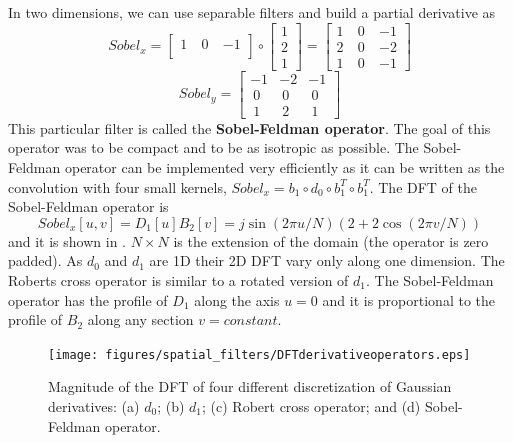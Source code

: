 In two dimensions, we can use separable filters and build a partial derivative as
\begin{equation}
	Sobel_x =  \begin{bmatrix}
		1 ~ & 0 ~ & -1 \\
	\end{bmatrix}\circ \begin{bmatrix}
		1 \\
		2 \\
		1
	\end{bmatrix}=
	\begin{bmatrix}
		1 ~ & 0 ~ & -1 \\
		2 ~ & 0 ~ & -2 \\
		1~  & 0 ~ & -1
	\end{bmatrix}
\end{equation}
\begin{equation}
	Sobel_y =  \begin{bmatrix}
		-1 & -2 & -1 \\
		~0 & ~0 & ~0 \\
		~1 & ~2 & ~1
	\end{bmatrix}
	\label{eq:sobel_kernels}
\end{equation}
This particular filter is called the {\bf Sobel-Feldman operator}.
The goal of this operator was to be compact and to be as isotropic as possible. The Sobel-Feldman operator can be implemented very efficiently as it can be written as the convolution with four small kernels, $Sobel_x=b_1 \circ d_0 \circ b_1^T \circ b_1^T$.
The DFT of the Sobel-Feldman operator is
\begin{equation}
	Sobel_x \left[u,v \right] = D_1\left[u\right] B_2 \left[v \right] = j \sin \left( 2 \pi u /N \right) \left( 2+2 \cos \left(2 \pi v/N \right) \right)
\end{equation}
and it is shown in . $N \times N$ is the extension of the domain (the operator is zero padded). As $d_0$ and $d_1$ are 1D their 2D DFT vary only along one dimension. The Roberts cross operator is similar to a rotated version of $d_1$. The Sobel-Feldman operator has the profile of $D_1$ along the axis $u=0$ and it is proportional to the profile of $B_2$ along any section $v=constant$.

\begin{figure}[t]
	\centerline{
		\texttt{[image: figures/spatial\_filters/DFTderivativeoperators.eps]}}
	\caption{Magnitude of the DFT of four different discretization of Gaussian derivatives: (a) $d_0$; (b) $d_1$; (c) Robert cross operator; and (d) Sobel-Feldman operator.
	}
	\label{fig:DFTderivativeoperators}
\end{figure}

